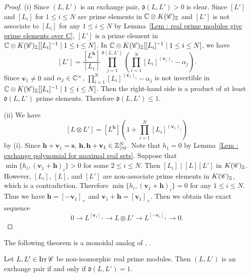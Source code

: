 \begin{proof}
(i) Since $(L, L')$ is an exchange pair,
$\mathfrak{d}(L, L') > 0$ is clear.
Since $[L']$ and $[L_i]$ for $1 \leq i \leq N$ are prime elements
in $\mathbb{C} \otimes K(\mathscr{C})_{\mathbb{Z}}$ and
$[L']$ is not associate to $[L_i]$ for any $1 \leq i \leq N$
by Lemma~\ref{Lem : real prime modules give prime elements over C},
$[L']$ is a prime element in
$\mathbb{C} \otimes K(\mathscr{C})_{\mathbb{Z}}
[[L_i]^{-1} \mid 1 \leq i \leq N]$.
In $\mathbb{C} \otimes K(\mathscr{C})_{\mathbb{Z}}
[[L_i]^{-1} \mid 1 \leq i \leq N]$, we have
\[
[L'] = \frac{[L^{\mathbf{h}}]}{[L_1]}
\prod_{j=1}^{\mathfrak{d}(L, L')}
\left(\prod_{i=1}^N[L_i]^{(\mathbf{v}_1)_i} - \alpha_j\right).
\]
Since $\mathbf{v}_1 \neq 0$ and $\alpha_j \in \mathbb{C}^{\times}$,
$\prod_{i=1}^N[L_i]^{(\mathbf{v}_1)_i} - \alpha_j$
is not invertible in
$\mathbb{C} \otimes K(\mathscr{C})_{\mathbb{Z}}
[[L_i]^{-1} \mid 1 \leq i \leq N]$.
Then the right-hand side is a product of at least
$\mathfrak{d}(L, L')$ prime elements.
Therefore $\mathfrak{d}(L, L') \leq 1$.

(ii) We have
\[
[L \otimes L'] = [L^{\mathbf{h}}]
\left(1 + \prod_{i=1}^N[L_i]^{(\mathbf{v}_1)_i}\right)
\]
by (i).
Since $\mathbf{h} + \mathbf{v}_1 = \mathbf{s}$,
$\mathbf{h}, \mathbf{h} + \mathbf{v}_1 \in \mathbb{Z}_{\geq 0}^N$.
Note that $h_1 = 0$
by Lemma~\ref{Lem : exchange polynomial for maximal real sets}.
Suppose that $\min\{h_i, (\mathbf{v}_1 + \mathbf{h})_i\} > 0$
for some $2 \leq i \leq N$.
Then $[L_i] \mid [L][L']$ in $K(\mathscr{C})_{\mathbb{Z}}$.
However, $[L_i]$, $[L]$, and $[L']$ are non-associate prime elements
in $K(\mathscr{C})_{\mathbb{Z}}$, which is a contradiction.
Therefore $\min\{h_i, (\mathbf{v}_1 + \mathbf{h})_i\} = 0$
for any $1 \leq i \leq N$.
Thus we have $\mathbf{h} = [-\mathbf{v}_1]_+$ and
$\mathbf{v}_1 + \mathbf{h} = [\mathbf{v}_1]_+$.
Then we obtain the exact sequence
\[
0 \longrightarrow L^{[\mathbf{v}_1]_+}
\longrightarrow L \otimes L'
\longrightarrow L^{[-\mathbf{v}_1]_+}
\longrightarrow 0.
\]
\end{proof}

The following theorem is a monoidal analog of
\cite[Theorem 7.5]{BMRRT}, \cite[Theorem 5.8]{FG}.

\begin{Thm}
\label{Thm : characterization of exchange pairs}
Let $L, L' \in \mathop{\mathrm{Irr}}\nolimits\mathscr{C}$ be non-isomorphic real prime modules.
Then $(L, L')$ is an exchange pair if and only if
$\mathfrak{d}(L, L') = 1$.
\end{Thm}

